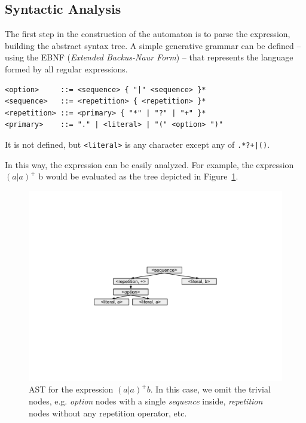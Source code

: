 \documentclass{llncs}
\begin{document}
\subsection{Syntactic Analysis}

The first step in the construction of the automaton is to parse the expression, building the abstract syntax tree. A simple generative grammar can be defined -- using the EBNF (\emph{Extended Backus-Naur Form}) -- that represents the language formed by all regular expressions.


\begin{verbatim}
<option>     ::= <sequence> { "|" <sequence> }*
<sequence>   ::= <repetition> { <repetition> }*
<repetition> ::= <primary> { "*" | "?" | "+" }*
<primary>    ::= "." | <literal> | "(" <option> ")"
\end{verbatim}

It is not defined, but \texttt{<literal>} is any character except any of \texttt{.*?+|()}. 

In this way, the expression can be easily analyzed. For example, the expression $(a|a)^+$ b would be evaluated as the tree depicted in Figure~\ref{fig:aab_parse_tree}.

\begin{figure}[!htbp]
  \centering
  \includegraphics[trim=3.7in 3.7in 3.7in 3.7in, scale=0.50]{figures/aab_parse_tree.pdf}
  \caption{AST for the expression $(a|a)^+b$. In this case, we omit the trivial nodes, e.g. \emph{option} nodes with a single \emph{sequence} inside, \emph{repetition} nodes without any repetition operator, etc.}
  \label{fig:aab_parse_tree}
\end{figure}
\end{document}
